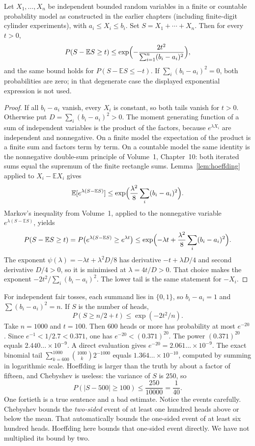 \begin{theorem}\label{thm:hoeffding}
Let $X_1,\ldots,X_n$ be independent bounded random variables in a finite or countable probability model as constructed in the earlier chapters (including finite-digit cylinder experiments), with $a_i\le X_i\le b_i$. Set $S=X_1+\cdots+X_n$. Then for every $t>0$,
\[
 P(S-\mathbb E S\ge t)\le\exp\Bigl(-\frac{2t^2}{\sum_{i=1}^n(b_i-a_i)^2}\Bigr),
\]
and the same bound holds for $P(S-\mathbb E S\le -t)$. If $\sum_i(b_i-a_i)^2=0$, both probabilities are zero; in that degenerate case the displayed exponential expression is not used.
\end{theorem}
\begin{proof}
If all $b_i-a_i$ vanish, every $X_i$ is constant, so both tails vanish for $t>0$. Otherwise put $D=\sum_i(b_i-a_i)^2>0$. The moment generating function of a sum of independent variables is the product of the factors, because $e^{\lambda X_i}$ are independent and nonnegative. On a finite model the expectation of the product is a finite sum and factors term by term. On a countable model the same identity is the nonnegative double-sum principle of Volume~1, Chapter~10: both iterated sums equal the supremum of the finite rectangle sums. Lemma~\ref{lem:hoeffding} applied to $X_i-\mathbb E X_i$ gives
\[
 \mathbb E[e^{\lambda(S-\mathbb ES)}]\le\exp\Bigl(\frac{\lambda^2}{8}\sum_i(b_i-a_i)^2\Bigr).
\]
Markov's inequality from Volume~1, applied to the nonnegative variable $e^{\lambda(S-\mathbb ES)}$, yields
\[
 P(S-\mathbb ES\ge t)=P\bigl(e^{\lambda(S-\mathbb ES)}\ge e^{\lambda t}\bigr)
 \le\exp\Bigl(-\lambda t+\frac{\lambda^2}{8}\sum_i(b_i-a_i)^2\Bigr).
\]
The exponent $\psi(\lambda)=-\lambda t+\lambda^2 D/8$ has derivative $-t+\lambda D/4$ and second derivative $D/4>0$, so it is minimised at $\lambda=4t/D>0$. That choice makes the exponent $-2t^2/\sum_i(b_i-a_i)^2$. The lower tail is the same statement for $-X_i$.
\end{proof}

For independent fair tosses, each summand lies in $\{0,1\}$, so $b_i-a_i=1$ and $\sum(b_i-a_i)^2=n$. If $S$ is the number of heads,
\[
 P(S\ge n/2+t)\le\exp(-2t^2/n).
\]
Take $n=1000$ and $t=100$. Then $600$ heads or more has probability at most $e^{-20}$. Since $e^{-1}<1/2.7<0.371$, one has $e^{-20}<(0.371)^{20}$. The power $(0.371)^{20}$ equals $2.440\ldots\times 10^{-9}$. A direct evaluation gives $e^{-20}=2.061\ldots\times 10^{-9}$. The exact binomial tail $\sum_{k=600}^{1000}\binom{1000}{k}2^{-1000}$ equals $1.364\ldots\times 10^{-10}$, computed by summing in logarithmic scale. Hoeffding is larger than the truth by about a factor of fifteen, and Chebyshev is useless: the variance of $S$ is $250$, so
\[
 P(|S-500|\ge100)\le\frac{250}{10000}=\frac1{40}.
\]
One fortieth is a true sentence and a bad estimate. Notice the events carefully. Chebyshev bounds the \emph{two-sided} event of at least one hundred heads above or below the mean. That automatically bounds the one-sided event of at least six hundred heads. Hoeffding here bounds that one-sided event directly. We have not multiplied its bound by two.

